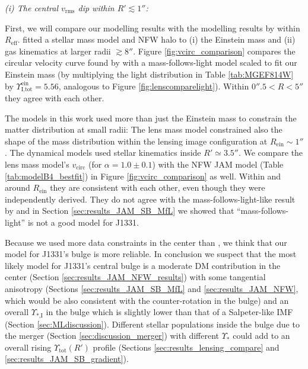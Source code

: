 \documentclass[useAMS,usenatbib]{mnras}
\begin{document}
\emph{(i) The central $v_\text{rms}$ dip within $R'\lesssim1''$:}

First, we will compare our modelling results with the modelling results by \citet{SWELLSV} within $R_\text{eff}$. \citet{SWELLSV} fitted a stellar mass model and NFW halo to (i) the Einstein mass and (ii) gas kinematics at larger radii $\gtrsim8''$. Figure \ref{fig:vcirc_comparison} compares the circular velocity curve found by \citet{SWELLSV} with a mass-follows-light model scaled to fit our Einstein mass (by multiplying the light distribution in Table \ref{tab:MGEF814W} by $\Upsilon_\text{I,tot}^\text{ein} = 5.56$, analogous to Figure \ref{fig:lenscomparelight}). Within $0''.5 < R < 5''$ they agree with each other. 

The models in this work used more than just the Einstein mass to constrain the matter distribution at small radii: The lens mass model constrained also the shape of the mass distribution within the lensing image configuration at $R_\text{ein} \sim 1''$. The dynamical models used stellar kinematics inside $R' \simeq 3.5''$. We compare the lens mass model's $v_\text{circ}$ (for $\alpha=1.0\pm 0.1$) with the NFW JAM model (Table \ref{tab:modelB4_bestfit}) in Figure \ref{fig:vcirc_comparison} as well. Within and around $R_\text{ein}$ they are consistent with each other, even though they were independently derived. They do not agree with the mass-follows-light-like result by \citet{SWELLSV} and in Section \ref{sec:results_JAM_SB_MfL} we showed that ``mass-follows-light'' is not a good model for J1331.

Because we used more data constraints in the center than \citet{SWELLSV}, we think that our model for J1331's bulge is more reliable. In conclusion we suspect that the most likely model for J1331's central bulge is a moderate DM contribution in the center (Section \ref{sec:results_JAM_NFW_results}) with some tangential anisotropy (Sections \ref{sec:results_JAM_SB_MfL} and \ref{sec:results_JAM_NFW}, which would be also consistent with the counter-rotation in the bulge) and an overall $\Upsilon_\text{*,I}$ in the bulge which is slightly lower than that of a Salpeter-like IMF (Section \ref{sec:MLdiscussion}). Different stellar populations inside the bulge due to the merger (Section \ref{sec:discussion_merger}) with different $\Upsilon_{*}$ could add to an overall rising $\Upsilon_\text{tot}(R')$ profile (Sections \ref{sec:results_lensing_compare} and \ref{sec:results_JAM_SB_gradient}).

\end{document}
